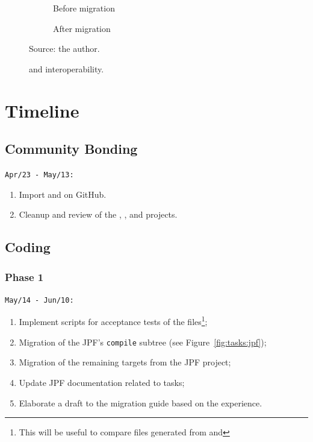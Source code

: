 \documentclass{article}
\begin{document}
\clearpage

\begin{figure}[t!]
    \centering
    \begin{subfigure}[b]{0.45\textwidth}
        
        \caption{Before migration}
    \end{subfigure}
    \hfill
    \begin{subfigure}[b]{0.45\textwidth}
        
        \caption{After migration}
    \end{subfigure}
    \caption{\ant{} and \gradle{} interoperability.\label{fig:gradle-ant-dep}}
    {\scriptsize Source: the author.}
\end{figure}

\section{Timeline}
\label{sec:time}

\subsection*{Community Bonding}

\noindent\texttt{Apr/23 - May/13:}

\begin{enumerate}
\item Import \jpfsymbc{} and \jpftemplate{} on GitHub.
\item Cleanup and review of the \jpfcore, \jpfsymbc, and \jpftemplate{}
      projects.
\end{enumerate}

\subsection*{Coding}
\subsubsection*{Phase 1}
\noindent\texttt{May/14 - Jun/10:}

\begin{enumerate}
\item Implement scripts for acceptance tests of the \jpfcore{} \jar{}
      files\footnote{This will be useful to compare \jar{} files generated from
      \gradle{} and \ant{}};
\item Migration of the JPF's \texttt{compile} subtree (see
      Figure~\ref{fig:tasks:jpf});
\item Migration of the remaining \ant{} targets from the JPF project;
\item Update JPF documentation related to \ant{} tasks;
\item Elaborate a draft to the migration guide based on the experience.
\end{enumerate}
\end{document}
